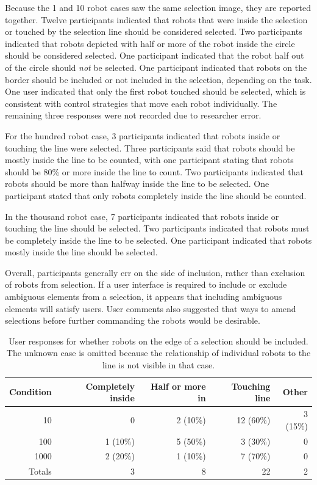Because the 1 and 10 robot cases saw the same selection image, they are reported together. 
Twelve participants indicated that robots that were inside the selection or touched by the selection line should be considered selected. 
Two participants indicated that robots depicted with half or more of the robot inside the circle should be considered selected. 
One participant indicated that the robot half out of the circle should \emph{not} be selected. 
One participant indicated that robots on the border should be included or not included in the selection, depending on the task. %
One user indicated that only the first robot touched should be selected, which is consistent with control strategies that move each robot individually. 
The remaining three responses were not recorded due to researcher error. 

For the hundred robot case, 3 participants indicated that robots inside or touching the line were selected. 
Three participants said that robots should be mostly inside the line to be counted, with one participant stating that robots should be 80\% or more inside the line to count. 
Two participants indicated that robots should be more than halfway inside the line to be selected. 
One participant stated that only robots completely inside the line should be counted. %

In the thousand robot case, 7 participants indicated that robots inside or touching the line should be selected. 
Two participants indicated that robots must be completely inside the line to be selected. 
One participant indicated that robots mostly inside the line should be selected. 

Overall, participants generally err on the side of inclusion, rather than exclusion of robots from selection.
If a user interface is required to include or exclude ambiguous elements from a selection, it appears that including ambiguous elements will satisfy users. 
User comments also suggested that ways to amend selections before further commanding the robots would be desirable.

\begin{table}
\begin{tabular}{ r r r r r}
	Condition & Completely inside & Half or more in & Touching line & Other\\
	\hline
	10 & 0 & 2 (10\%) & 12 (60\%) & 3 (15\%)\\
	
	100 & 1 (10\%) & 5 (50\%) & 3 (30\%) & 0 \\
	1000 & 2 (20\%) & 1 (10\%) & 7 (70\%) & 0\\
	\hline
	Totals & 3 & 8 & 22 & 2 \\
\end{tabular}
\caption{User responses for whether robots on the edge of a selection should be included. The unknown case is omitted because the relationship of individual robots to the line is not visible in that case. }
\end{table}

